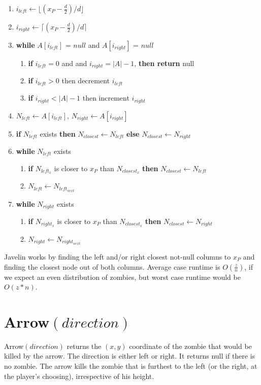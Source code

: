 \documentclass{article}
\begin{document}
\begin{enumerate}
    \item  $i_{left} \leftarrow \lfloor (x_P-\frac{d}{2})/d \rfloor$
    \item  $i_{right} \leftarrow \lceil (x_P-\frac{d}{2})/d \rceil$
    \item \textbf{while} $A[i_{left}]$ = $null$ and $A[i_{right}]$ = $null$
    \begin{enumerate}
        \item \textbf{if} $i_{left} = 0$ and and $i_{right} = |A|-1$, \textbf{then return} null
        \item \textbf{if} $i_{left} > 0$ then decrement $i_{left}$
        \item \textbf{if} $i_{right} < |A|-1$ then increment $i_{right}$
    \end{enumerate}
    \item $N_{left} \leftarrow A[i_{left}]$, $N_{right} \leftarrow A[i_{right}]$
    \item \textbf{if} $N_{left}$ exists \textbf{then} $N_{closest} \leftarrow N_{left}$ \textbf{else} $N_{closest} \leftarrow N_{right}$ 
    \item \textbf{while} $N_{left}$ exists
    \begin{enumerate}
        \item \textbf{if} $N_{left_x}$ is closer to $x_P$ than $N_{closest_x}$ \textbf{then} $N_{closest} \leftarrow N_{left}$
        \item $N_{left} \leftarrow N_{left_{next}}$
    \end{enumerate}
    \item \textbf{while} $N_{right}$ exists
    \begin{enumerate}
        \item \textbf{if} $N_{right_x}$ is closer to $x_P$ than $N_{closest_x}$ \textbf{then} $N_{closest} \leftarrow N_{right}$
        \item $N_{right} \leftarrow N_{right_{next}}$
    \end{enumerate}
\end{enumerate}
Javelin works by finding the left and/or right closest not-null columns to $x_P$ and finding the closest node out of both columns. Average case runtime is $O(\frac{z}{n})$, if we expect an even distribution of zombies, but worst case runtime would be $O(z*n)$.

\section{Arrow$(direction)$}
Arrow$(direction)$ returns  the  $(x,y)$ coordinate of the zombie that would be killed by the arrow. The direction is either left or right. It returns null if there is no zombie. The arrow  kills  the  zombie  that  is  furthest  to  the  left  (or  the  right, at the player’s choosing), irrespective of his height.
\end{document}

